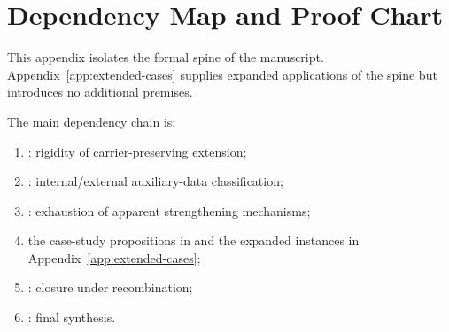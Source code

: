\section{Dependency Map and Proof Chart}\label{app:dependency-map}

This appendix isolates the formal spine of the manuscript. Appendix~\ref{app:extended-cases} supplies expanded applications of the spine but introduces no additional premises.

The main dependency chain is:
\begin{enumerate}[label=D\arabic*., leftmargin=3em]
    \item {}: rigidity of carrier-preserving extension;
    \item {}: internal/external auxiliary-data classification;
    \item {}: exhaustion of apparent strengthening mechanisms;
    \item the case-study propositions in  and the expanded instances in Appendix~\ref{app:extended-cases};
    \item {}: closure under recombination;
    \item {}: final synthesis.
\end{enumerate}
